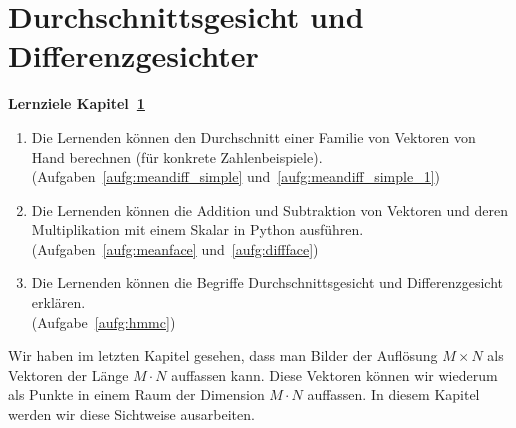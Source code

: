 \section{Durchschnittsgesicht und Differenzgesichter} \label{sec:facespace}
\begin{tcolorbox}
	\centerline{\textbf{Lernziele Kapitel~\ref{sec:facespace}}}
	\begin{enumerate}[leftmargin=*,label=\thesection.\arabic*]
		\item \label{item:meandiff_simple} Die Lernenden können den Durchschnitt einer Familie von Vektoren von Hand berechnen (für konkrete Zahlenbeispiele).\\
		(Aufgaben~\ref{aufg:meandiff_simple} und~\ref{aufg:meandiff_simple_1})
		\item \label{item:meanface} Die Lernenden können die Addition und Subtraktion von Vektoren und deren Multiplikation mit einem Skalar in Python ausführen.\\
		(Aufgaben~\ref{aufg:meanface} und~\ref{aufg:diffface})
		\item \label{item:hmmc} Die Lernenden können die Begriffe Durchschnittsgesicht und Differenzgesicht erklären.\\
		(Aufgabe~\ref{aufg:hmmc})
	\end{enumerate}
\end{tcolorbox}
Wir haben im letzten Kapitel gesehen, dass man Bilder der Auflösung $M\times N$ als Vektoren der Länge $M\cdot N$ auffassen kann.
Diese Vektoren können wir wiederum als Punkte in einem Raum der Dimension $M\cdot N$ auffassen.
In diesem Kapitel werden wir diese Sichtweise ausarbeiten.

